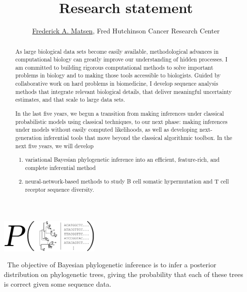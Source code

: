 \documentclass[nobib]{tufte-handout}
\title{Research statement}
\author{\href{http://matsen.fredhutch.org/}{Frederick A. Matsen}, Fred Hutchinson Cancer Research Center}
\begin{document}
\maketitle

\begin{abstract}
\noindent
As large biological data sets become easily available, methodological advances in computational biology can greatly improve our understanding of hidden processes.
I am committed to building rigorous computational methods to solve important problems in biology and to making those tools accessible to biologists.
Guided by collaborative work on hard problems in biomedicine, I develop sequence analysis methods that integrate relevant biological details, that deliver meaningful uncertainty estimates, and that scale to large data sets.


\vspace{0.15cm}

\noindent
In the last five years, we begun a transition from making inferences under classical probabilistic models using classical techniques, to our next phase: making inferences under models without easily computed likelihoods, as well as developing next-generation inferential tools that move beyond the classical algorithmic toolbox.
In the next five years, we will develop
\begin{enumerate}
\item variational Bayesian phylogenetic inference into an efficient, feature-rich, and complete inferential method
\item neural-network-based methods to study B cell somatic hypermutation and T cell receptor sequence diversity.
\end{enumerate}
\end{abstract}

\begin{marginfigure}[0.8in]%
  \includegraphics[width=1.95in]{bayesian_phylo}
  \caption{\
The objective of Bayesian phylogenetic inference is to infer a posterior distribution on phylogenetic trees, giving the probability that each of these trees is correct given some sequence data.
    }
  \label{FIGbayesPhylo}
\end{marginfigure}%


\vspace{0.3cm}
\end{document}

